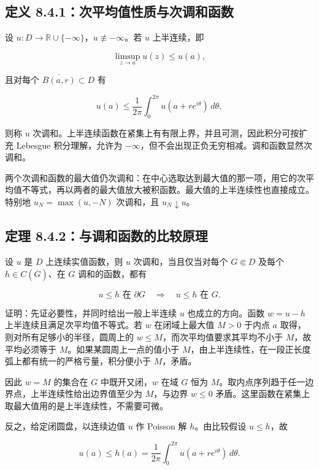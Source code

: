 \documentclass[11pt,a4paper]{article}
\begin{document}
\subsection{定义 8.4.1：次平均值性质与次调和函数}\label{ch08-s4-heading-2}

设 \(u:D\to\mathbb R\cup\{-\infty\}\)，\(u\not\equiv-\infty\)。若 \(u\)
上半连续，即

\[
\limsup_{z\to a}u(z)\le u(a),\tag{8.4.A}
\]

且对每个 \(\overline{B(a,r)}\subset D\) 有

\[
u(a)\le\frac1{2\pi}\int_0^{2\pi}u(a+re^{i\theta})\,d\theta,\tag{8.4.1}
\]

则称 \(u\)
次调和。上半连续函数在紧集上有有限上界，并且可测，因此积分可按扩充
Lebesgue 积分理解，允许为
\(-\infty\)，但不会出现正负无穷相减。调和函数显然次调和。

两个次调和函数的最大值仍次调和：在中心选取达到最大值的那一项，用它的次平均值不等式，再以两者的最大值放大被积函数。最大值的上半连续性也直接成立。特别地
\(u_N=\max(u,-N)\) 次调和，且 \(u_N\downarrow u\)。

\subsection{定理 8.4.2：与调和函数的比较原理}\label{ch08-s4-heading-3}

设 \(u\) 是 \(D\) 上连续实值函数，则 \(u\) 次调和，当且仅当对每个
\(G\Subset D\) 及每个 \(h\in C(\overline G)\)、在 \(G\) 调和的函数，都有

\[
u\le h\text{ 在 }\partial G\quad\Longrightarrow\quad u\le h\text{ 在 }G.\tag{8.4.B}
\]

证明：先证必要性，并同时给出一般上半连续 \(u\) 也成立的方向。函数
\(w=u-h\) 上半连续且满足次平均值不等式。若 \(w\) 在闭域上最大值 \(M>0\)
于内点 \(a\) 取得，则对所有足够小的半径，圆周上的
\(w\le M\)，而次平均值要求其平均不小于 \(M\)，故平均必须等于
\(M\)。如果某圆周上一点的值小于
\(M\)，由上半连续性，在一段正长度弧上都有统一的严格亏量，积分便小于
\(M\)，矛盾。

因此 \(w=M\) 的集合在 \(G\) 中既开又闭，\(w\) 在域 \(G\) 恒为
\(M\)。取内点序列趋于任一边界点，上半连续性给出边界值至少为
\(M\)，与边界 \(w\le0\)
矛盾。这里函数在紧集上取最大值用的是上半连续性，不需要可微。

反之，给定闭圆盘，以连续边值 \(u\) 作 Poisson 解 \(h\)。由比较假设
\(u\le h\)，故

\[
u(a)\le h(a)=\frac1{2\pi}\int_0^{2\pi}u(a+re^{i\theta})\,d\theta.
\]
\end{document}
